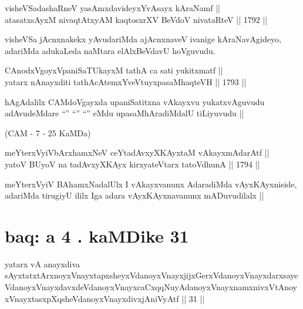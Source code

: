 
\begin{shl}
visheVSadashaRneV yasAmxdavideyxYvAsayx kAraNamf || \\
atasatxsAyxM nivaqtAtxyAM kaqtosxrXV BeVdoV nivataRteV ||  1792 ||  
\end{shl}

\begin{artha}
visheVSa jAcnxnakekx yAvudariMda ajAcnxnaveV ivanige kAraNavAgideyo,
adariMda adukaLeda naMtara elAlxBeVdavU hoVguvudu.
\end{artha}


\begin{shl}
CAnodxVgoyxVpaniSaTUkayxM tathA ca sati yukitxmatf ||  \\
yatarx nAnayxditi tathAcA\s \s temxYveVtuyxpasaMhaqteVH ||  1793 ||  
\end{shl}

\begin{artha}
hAgAdalilx CAMdoVgayxda upaniSatitxna vAkayxvu yukatxvAguvudu
adAvudeMdare ``\stext'' ``\stext'' ``\stext'' eMdu upasaMhAradiMdalU
tiLiyuvudu ||
\end{artha}

(CAM - 7 - 25 KaMDa)

\begin{shl}
meYterxVyiVbArxhamxNeV ceYtadAvxyXKAyxtaM vAkayxmAdarAtf || \\
yatoV BUyoV na tadAvxyXKAyx kirxyateV\s tarx tatoV\s dhunA ||  1794 ||  
\end{shl}

\begin{artha}
meYterxVyiV BAhamxNadalUlx I vAkayxvanunx AdaradiMda vAyxKAyxniside,
adariMda tirugiyU ililx Iga adara vAyxKAyxnavanunx mADuvudilalx ||
\end{artha}

\section*{baq: a 4 . kaMDike 31}

\begin{shl}
yatarx vA anayxdiva sAyxtatxtArxnoyxV\s nayxtapxsheyxVdanoyxV\s nayxjijxGerxVdanoyxV\s nayxdarxsayeVdanoyxV\s nayxdavxdeVdanoyxV\s nayxcaCxqqNuyAdanoyxV\s nayxnamxnivxVtAnoyxV\s nayxtasxpXqsheVdanoyxV\s nayxdivxjAniVyAtf || 31 ||
\end{shl}

